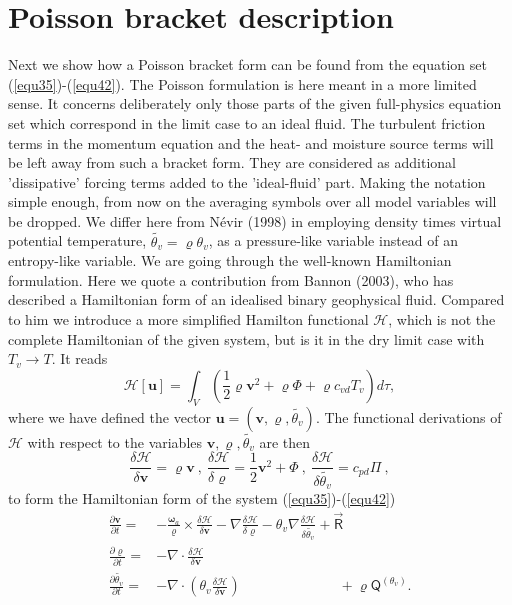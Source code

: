 \section{Poisson bracket description}
Next we show how a Poisson bracket form can be found from the equation set (\ref{equ35})-(\ref{equ42}). The Poisson formulation is here meant in a more limited sense. It concerns deliberately only those parts of the given full-physics equation set which correspond in the limit case to an ideal fluid. The turbulent friction terms in the momentum equation and the heat- and moisture source terms will be left away from such a  bracket form. They are considered as additional 'dissipative' forcing terms added to the 'ideal-fluid' part.  Making the notation simple enough, from now on the averaging symbols over all model variables will be dropped. We differ here from N\'evir (1998) in employing density times virtual potential temperature, $\tilde{\theta_v}= \varrho\theta_v $, as a pressure-like variable instead of an entropy-like variable. We are going through the well-known Hamiltonian formulation. Here we quote a contribution from Bannon (2003), who has described a Hamiltonian form of an idealised binary geophysical fluid.  Compared to him we introduce a more simplified Hamilton functional $\mathcal{H}$, which is not the complete Hamiltonian of the given system, but is it in the dry limit case with $T_v \rightarrow T $. It reads
\begin{equation}
\mathcal{H}\left[\mathbf{u}\right]  =
\int_V \left( \frac{1}{2}\varrho \mathbf{v}^2 + \varrho \Phi + \varrho c_{vd} T_v \right) d\tau   ,\label{equ45}
\end{equation} 
where we have defined the vector $\mathbf{u}= (\mathbf{v}, \varrho, \tilde{\theta_v}) $. The functional derivations of $\mathcal{H}$ with respect to the variables $\mathbf{v}, \varrho, \tilde{\theta_v}$ are then
\begin{equation}
\frac{\delta \mathcal{H}}{\delta \mathbf{v}}= \varrho \mathbf{v}\:,\:
\frac{\delta \mathcal{H}}{\delta \varrho}= \frac{1}{2} \mathbf{v}^2 + \Phi \:,\: \frac{\delta \mathcal{H}}{\delta \tilde{\theta_v}}=
 c_{pd} \Pi \:, \label{equ46}
\end{equation} 
to form the Hamiltonian form of the system (\ref{equ35})-(\ref{equ42})
\begin{align}
\frac{\partial \textbf{v}}{\partial t} =& - \frac{\boldsymbol{\omega}_a}{\varrho}
\times \frac{\delta \mathcal{H}}{\delta \textbf{v}} - \nabla
\frac{\delta \mathcal{H}}{\delta \varrho} -  \theta_v \nabla \frac{\delta \mathcal{H}}{\delta \tilde{\theta_v}}
+ \vec{\mathsf{R}} \label{equ47}\\
\frac{\partial \varrho}{\partial t} =& - \nabla \cdot \frac{\delta \mathcal{H}}{\delta \textbf{v}} \label{equ48}\\
\frac{\partial \tilde{\theta_v}}{\partial t} =& - \nabla \!\!\cdot \!\!\left(  \theta_v\frac{\delta \mathcal{H}}{\delta \textbf{v}}\right) \qquad \qquad \qquad \quad+ \varrho\mathsf{Q}^{\left( \theta_v\right) }. \label{equ49}
\end{align} 

